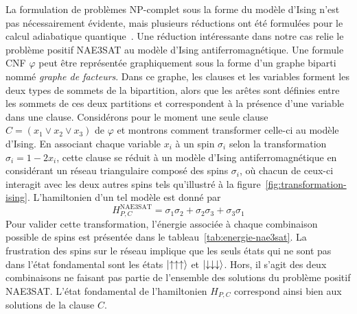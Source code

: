 La formulation de problèmes \textsf{NP}-complet sous la forme du modèle d'Ising n'est pas nécessairement évidente, mais plusieurs réductions ont été formulées pour le calcul adiabatique quantique~\cite{lucasIsingFormulationsMany2014,lodewijksMappingNPhardNPcomplete2020}. Une réduction intéressante dans notre cas relie le problème positif NAE3SAT au modèle d'Ising antiferromagnétique. Une formule CNF $\varphi$ peut être représentée graphiquement sous la forme d'un graphe biparti nommé \textit{graphe de facteurs}. Dans ce graphe, les clauses et les variables forment les deux types de sommets de la bipartition, alors que les arêtes sont définies entre les sommets de ces deux partitions et correspondent à la présence d'une variable dans une clause. Considérons pour le moment une seule clause $C = (x_{1} \lor x_{2} \lor x_{3})$ de $\varphi$ et montrons comment transformer celle-ci au modèle d'Ising. En associant chaque variable $x_{i}$ à un spin $\sigma_{i}$ selon la transformation $\sigma_{i} = 1 - 2x_{i}$, cette clause se réduit à un modèle d'Ising antiferromagnétique en considérant un réseau triangulaire composé des spins $\sigma_{i}$, où chacun de ceux-ci interagit avec les deux autres spins tels qu'illustré à la figure~\ref{fig:transformation-ising}. L'hamiltonien d'un tel modèle est donné par
\begin{equation}
    H_{P, C}^{\text{NAE3SAT}} = \sigma_{1}\sigma_{2} + \sigma_{2}\sigma_{3} + \sigma_{3}\sigma_{1}
\end{equation}
Pour valider cette transformation, l'énergie associée à chaque combinaison possible de spins est présentée dans le tableau~\ref{tab:energie-nae3sat}. La frustration des spins sur le réseau implique que les seuls états qui ne sont pas dans l'état fondamental sont les états $\ket{\uparrow \uparrow \uparrow}$ et $\ket{\downarrow \downarrow \downarrow}$. Hors, il s'agit des deux combinaisons ne faisant pas partie de l'ensemble des solutions du problème positif NAE3SAT. L'état fondamental de l'hamiltonien $H_{P, C}$ correspond ainsi bien aux solutions de la clause $C$.

